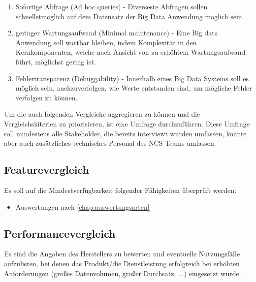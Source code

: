 \begin{enumerate}
\item Sofortige Abfrage (Ad hoc queries) - 
Diverseste Abfragen sollen schnellstmöglich auf dem Datensatz der Big Data Anwendung möglich sein.

\item geringer Wartungsaufwand (Minimal maintenance) - 
Eine Big data Anwendung soll wartbar bleiben, indem Komplexität in den Kernkomponenten, welche nach Ansicht von \citeauthor{Marz.2015} zu erhöhtem Wartungsaufwand führt, möglichst gering ist.

\item Fehlertransparenz (Debuggability) - 
Innerhalb eines Big Data Systems soll es möglich sein, nachzuverfolgen, wie Werte entstanden sind, um mögliche Fehler verfolgen zu können.
\end{enumerate}

Um die auch folgenden Vergleiche aggregieren zu können und die Vergleichskiterien zu priorisieren, ist eine Umfrage durchzuführen. Diese Umfrage soll mindestens alle Stakeholder, die bereits interviewt wurden umfassen, könnte aber auch zusätzliches technisches Personal des \ac{NCS} Teams umfassen.


\subsection{Featurevergleich}
Es soll auf die Mindestverfügbarkeit folgender Fähigkeiten überprüft werden:
\begin{itemize}
\item Auswertungen nach \autoref{chap:auswertungsarten}
\end{itemize}

\subsection{Performancevergleich}
Es sind die Angaben des Herstellers zu bewerten und eventuelle Nutzungsfälle aufzulisten, bei denen das Produkt/die Dienstleistung erfolgreich bei erhöhten Anforderungen (großes Datenvolumen, großer Durchsatz, ...) eingesetzt wurde.

